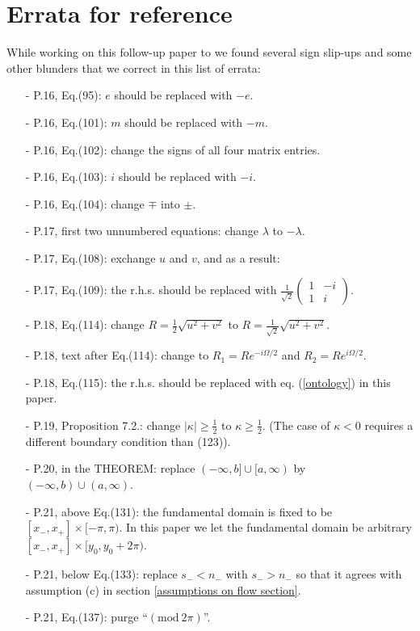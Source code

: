 \documentclass[11 pt]{article}
\newcommand\Om{\Omega}
\renewcommand\({\left(}
\renewcommand\){\right)}
\renewcommand\Om{\Omega}
\newcommand\<{\langle}
\renewcommand\>{\rangle}
\newcommand\8{\infty}
\newcommand{\la} {\lambda}\newcommand{\La}{\Lambda}
\newcommand{\half}{\frac{1}{2}}
\begin{document}
\section{Errata for reference \cite{KTZzGKNDa}}
While working on this follow-up paper to \cite{KTZzGKNDa} we found several sign slip-ups and some other blunders
that we correct in this list of errata:
\begin{itemize}
\item[-] P.16, Eq.(95): $e$ should be replaced with $-e$.
\item[-] P.16, Eq.(101): $m$ should be replaced with $-m$.
\item[-] P.16, Eq.(102): change the signs of all four matrix entries.
\item[-] P.16, Eq.(103): $i$ should be replaced with $-i$. 
\item[-] P.16, Eq.(104): change $\mp$ into $\pm$.
\item[-] P.17, first two unnumbered equations: change $\la$ to $-\la$.
\item[-] P.17, Eq.(108): exchange $u$ and $v$, and as a result:
\item[-] P.17, Eq.(109): the r.h.s. should be replaced with $\frac{1}{\sqrt{2}}\begin{pmatrix} 1 & -i\\ 1 & i \end{pmatrix}$.
\item[-] P.18, Eq.(114): change $R = \half\sqrt{u^2+v^2}$ to $R = \frac{1}{\sqrt{2}}\sqrt{u^2+v^2}$.
\item[-] P.18, text after Eq.(114): change to $R_1 = Re^{-i\Om/2}$ and $R_2 = Re^{i\Om/2}$.
\item[-] P.18, Eq.(115): the r.h.s. should be replaced with eq. (\ref{ontology}) in this paper.
\item[-] P.19, Proposition 7.2.: change $|\kappa|\geq \half$ to $\kappa\geq \half$. (The case of $\kappa<0$ requires a different boundary condition than (123)).
\item[-] P.20, in the THEOREM: replace $(-\infty,b]\cup[a,\infty)$ by $(-\infty,b)\cup (a,\infty)$.
\item[-] P.21, above Eq.(131): the fundamental domain is fixed to be $[x_-, x_+] \times [-\pi, \pi)$. In this paper we let the fundamental domain be arbitrary $[x_-, x_+] \times [y_0, y_0 + 2\pi)$. 
\item[-] P.21, below Eq.(133): replace $s_- < n_-$ with $s_- > n_-$ so that it agrees with assumption (c) in section \ref{assumptions on flow section}. 
\item[-] P.21, Eq.(137): purge ``$(\text{mod}\: 2\pi)$''.

\end{itemize}
\end{document}
